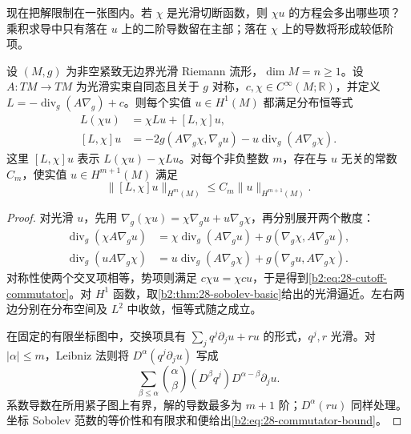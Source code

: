 \ProseParagraphBreak

现在把解限制在一张图内。若 \(\chi\) 是光滑切断函数，则 \(\chi u\) 的方程会多出哪些项？乘积求导中只有落在 \(u\) 上的二阶导数留在主部；落在 \(\chi\) 上的导数将形成较低阶项。

\begin{lemma}[切断乘子的交换公式]\label{b2:lem:28-cutoff-commutator}
设 \((M,g)\) 为非空紧致无边界光滑 Riemann 流形，\(\dim M=n\geq1\)。设 \(A:TM\to TM\) 为光滑实束自同态且关于 \(g\) 对称，\(c,\chi\in C^\infty(M;\mathbb R)\)，并定义 \(L=-\operatorname{div}_g(A\nabla_g)+c\)。则每个实值 \(u\in H^1(M)\) 都满足分布恒等式
\begin{equation}\label{b2:eq:28-cutoff-commutator}
 \begin{aligned}
 L(\chi u)&=\chi Lu+[L,\chi]u,\\
 [L,\chi]u&=-2g(A\nabla_g\chi,\nabla_g u)
              -u\operatorname{div}_g(A\nabla_g\chi).
 \end{aligned}
\end{equation}
这里 \([L,\chi]u\) 表示 \(L(\chi u)-\chi Lu\)。对每个非负整数 \(m\)，存在与 \(u\) 无关的常数 \(C_m\)，使实值 \(u\in H^{m+1}(M)\) 满足
\begin{equation}\label{b2:eq:28-commutator-bound}
 \|[L,\chi]u\|_{H^m(M)}\leq C_m\|u\|_{H^{m+1}(M)}.
\end{equation}
\end{lemma}
\begin{proof}
对光滑 \(u\)，先用 \(\nabla_g(\chi u)=\chi\nabla_g u+u\nabla_g\chi\)，再分别展开两个散度：
\[
 \begin{aligned}
 \operatorname{div}_g(\chi A\nabla_g u)
 &=\chi\operatorname{div}_g(A\nabla_g u)
       +g(\nabla_g\chi,A\nabla_g u),\\
 \operatorname{div}_g(uA\nabla_g\chi)
 &=u\operatorname{div}_g(A\nabla_g\chi)
       +g(\nabla_g u,A\nabla_g\chi).
 \end{aligned}
\]
对称性使两个交叉项相等，势项则满足 \(c\chi u=\chi cu\)，于是得到\eqref{b2:eq:28-cutoff-commutator}。对 \(H^1\) 函数，取\cref{b2:thm:28-sobolev-basic}给出的光滑逼近。左右两边分别在分布空间及 \(L^2\) 中收敛，恒等式随之成立。

在固定的有限坐标图中，交换项具有
\(\sum_j q^j\partial_j u+ru\) 的形式，\(q^j,r\) 光滑。对 \(|\alpha|\leq m\)，Leibniz 法则将
\(D^\alpha(q^j\partial_j u)\) 写成
\[
 \sum_{\beta\leq\alpha}\binom\alpha\beta
       (D^\beta q^j)D^{\alpha-\beta}\partial_j u.
\]
系数导数在所用紧子图上有界，解的导数最多为 \(m+1\) 阶；\(D^\alpha(ru)\) 同样处理。坐标 Sobolev 范数的等价性和有限求和便给出\eqref{b2:eq:28-commutator-bound}。
\end{proof}

